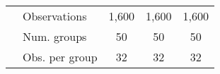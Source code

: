 \begin{tabular}{l|lccc}
& Observations & 1,600 & 1,600 & 1,600 \\ 

& Num. groups  & 50 & 50 & 50 \\ 

& Obs. per group  &32&32&32\\ 
\end{tabular} 
